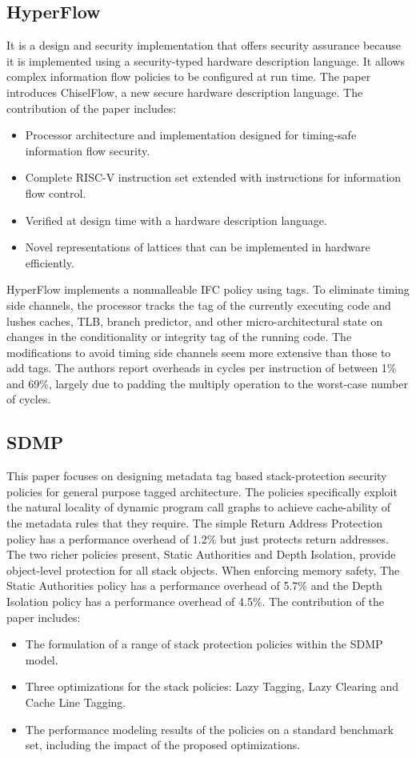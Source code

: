 \subsection{HyperFlow \cite{HyperFlow}} 
It is a design and security implementation that offers security assurance because it is implemented 
using a security-typed hardware description language. It allows complex information flow policies to 
be configured at run time. The paper introduces ChiselFlow, a new secure hardware description language. 
The contribution of the paper includes: 
\begin{itemize}
  \item Processor architecture and implementation designed for timing-safe information flow security. 
  \item Complete RISC-V instruction set extended with instructions for information flow control. 
  \item Verified at design time with a hardware description language. 
  \item Novel representations of lattices that can be implemented in hardware efficiently. 
\end{itemize}
HyperFlow implements a nonmalleable IFC policy using tags.
To eliminate timing side channels, the processor tracks the tag of the currently executing code and lushes caches,
TLB, branch predictor, and other micro-architectural state on changes in the conditionality or integrity tag of the
running code. The modifications to avoid timing side channels seem more extensive than those to add tags. The
authors report overheads in cycles per instruction of between 1\% and 69\%, largely due to padding the multiply
operation to the worst-case number of cycles.

\subsection{SDMP \cite{Sdmp}}
This paper focuses on designing metadata tag based stack-protection security policies for general purpose tagged
architecture. The policies specifically
exploit the natural locality of dynamic program call graphs to
achieve cache-ability of the metadata rules that they require.
The simple Return Address Protection policy has a performance
overhead of 1.2\% but just protects return addresses.
The two richer policies present, Static Authorities and Depth Isolation, 
provide object-level protection for all stack objects. When
enforcing memory safety, The Static Authorities policy has a
performance overhead of 5.7\% and the Depth Isolation policy
has a performance overhead of 4.5\%.
The contribution of the paper includes:
\begin{itemize}
  \item The formulation of a range of stack protection policies
within the SDMP model.
  \item Three optimizations for the stack policies: Lazy Tagging,
Lazy Clearing and Cache Line Tagging.
  \item The performance modeling results of the policies on
a standard benchmark set, including the impact of the
proposed optimizations.
\end{itemize}

